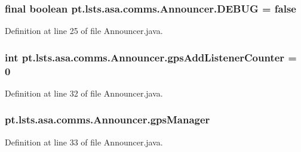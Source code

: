 \subsubsection[{D\+E\+B\+U\+G}]{\setlength{\rightskip}{0pt plus 5cm}final boolean pt.\+lsts.\+asa.\+comms.\+Announcer.\+D\+E\+B\+U\+G = false\hspace{0.3cm}{\ttfamily [static]}}\label{classpt_1_1lsts_1_1asa_1_1comms_1_1Announcer_a708b0e5d2f0d2e716f55597dbbc8f5d4}


Definition at line 25 of file Announcer.\+java.

\hypertarget{classpt_1_1lsts_1_1asa_1_1comms_1_1Announcer_a6c6423b8c761aca8f7b0063bb2e18635}{}
\subsubsection[{gps\+Add\+Listener\+Counter}]{\setlength{\rightskip}{0pt plus 5cm}int pt.\+lsts.\+asa.\+comms.\+Announcer.\+gps\+Add\+Listener\+Counter = 0\hspace{0.3cm}{\ttfamily [private]}}\label{classpt_1_1lsts_1_1asa_1_1comms_1_1Announcer_a6c6423b8c761aca8f7b0063bb2e18635}


Definition at line 32 of file Announcer.\+java.

\hypertarget{classpt_1_1lsts_1_1asa_1_1comms_1_1Announcer_a08b04d9ec24009895e3f19671bf92e55}{}
\subsubsection[{gps\+Manager}]{ pt.\+lsts.\+asa.\+comms.\+Announcer.\+gps\+Manager\hspace{0.3cm}{\ttfamily [private]}}\label{classpt_1_1lsts_1_1asa_1_1comms_1_1Announcer_a08b04d9ec24009895e3f19671bf92e55}


Definition at line 33 of file Announcer.\+java.

\hypertarget{classpt_1_1lsts_1_1asa_1_1comms_1_1Announcer_a899369bb5523890384993f85eea10fdd}{}
